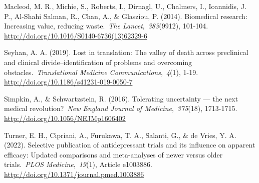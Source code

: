 \documentclass[authordate, empirical, issue]{jote-new-article}
\begin{document}
	Macleod, M. R., Michie, S., Roberts, I., Dirnagl, U., Chalmers, I., Ioannidis, J. P., Al-Shahi Salman, R., Chan, A., \& Glasziou, P. (2014). Biomedical research: Increasing value, reducing waste. \emph{The Lancet}, \emph{383}(9912), 101-104. \url{http://doi.org/10.1016/S0140-6736(13)62329-6} 
	
	Seyhan, A. A. (2019). Lost in translation: The valley of death across preclinical and clinical divide--identification of problems and overcoming obstacles. \emph{Translational Medicine Communications}, \emph{4}(1), 1-19. \url{http://doi.org/10.1186/s41231-019-0050-7}
	
	Simpkin, A., \& Schwartzstein, R. (2016). Tolerating uncertainty — the next medical revolution? \emph{New England Journal of Medicine}, \emph{375}(18), 1713-1715. \url{http://doi.org/10.1056/NEJMp1606402} 
	
	Turner, E. H., Cipriani, A., Furukawa, T. A., Salanti, G., \& de Vries, Y. A. (2022). Selective publication of antidepressant trials and its influence on apparent efficacy: Updated comparisons and meta-analyses of newer versus older trials. \emph{PLOS Medicine}, \emph{19}(1), Article e1003886. \url{http://doi.org/10.1371/journal.pmed.1003886}
\end{document}
